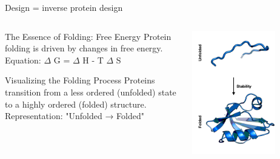 \documentclass[presentation,smaller]{beamer}
\begin{document}
\begin{frame}[label={sec:orgef5e774}]{Design = inverse protein design}
\begin{columns}
\begin{column}{0.5\columnwidth}
\begin{block}{The Essence of Folding: Free Energy}
Protein folding is driven by changes in free energy.
Equation: \(\Delta\) G = \(\Delta\) H - T \(\Delta\) S
\end{block}

\begin{block}{Visualizing the Folding Process}
Proteins transition from a less ordered (unfolded) state to a highly ordered
(folded) structure. Representation: "Unfolded → Folded"
\end{block}
\end{column}

\begin{column}{0.5\columnwidth}
\begin{center}
\includegraphics[width=0.7\textwidth]{./img/s1_f3.png}
\end{center}
\end{column}
\end{columns}
\end{frame}
\end{document}

